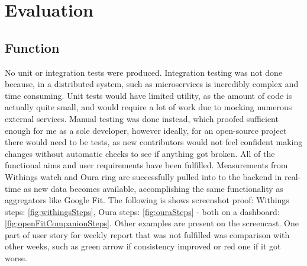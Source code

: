 \chapter{Evaluation}
\label{cha:evaluation}
\section{Function}
No unit or integration tests were produced. Integration testing was not done because, in a distributed system, such as microservices is incredibly complex and time consuming. Unit tests would have limited utility, as the amount of code is actually quite small, and would require a lot of work due to mocking numerous external services. Manual testing was done instead, which proofed sufficient enough for me as a sole developer, however ideally, for an open-source project there would need to be tests, as new contributors would not feel confident making changes without automatic checks to see if anything got broken.
All of the functional aims and user requirements have been fulfilled. Measurements from Withings watch and Oura ring are successfully pulled into to the backend in real-time as new data becomes available, accomplishing the same functionality as aggregators like Google Fit. The following is shows screenshot proof: Withings steps: \ref{fig:withingsSteps}, Oura steps: \ref{fig:ouraSteps} - both on a dashboard: \ref{fig:openFitCompanionSteps}. Other examples are present on the screencast.
One part of user story for weekly report that was not fulfilled was comparison with other weeks, such as green arrow if consistency improved or red one if it got worse. 
